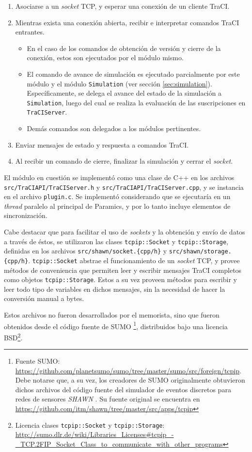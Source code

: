 \begin{enumerate}
    \item Asociarse a un \emph{socket} TCP, y esperar una conexión de un cliente TraCI.
    \item Mientras exista una conexión abierta, recibir e interpretar comandos TraCI entrantes.
    \begin{itemize}
        \item En el caso de los comandos de obtención de versión y cierre de la conexión, estos son ejecutados por el módulo mismo.
        \item El comando de avance de simulación es ejecutado parcialmente por este módulo y el módulo \texttt{Simulation} (ver sección \ref{sec:simulation}). Específicamente, se delega el avance del estado de la simulación a \texttt{Simulation}, luego del cual se realiza la evaluación de las suscripciones en \texttt{TraCIServer}.
        \item Demás comandos son delegados a los módulos pertinentes.
    \end{itemize}
    \item Enviar mensajes de estado y respuesta a comandos TraCI.
    \item Al recibir un comando de cierre, finalizar la simulación y cerrar el \emph{socket}.
\end{enumerate}

El módulo en cuestión se implementó como una clase de C++ en los archivos \texttt{src/TraCIAPI/TraCIServer.h} y \texttt{src/TraCIAPI/TraCIServer.cpp}, y se instancia en el archivo \texttt{plugin.c}. Se implementó considerando que se ejecutaría en un \emph{thread} paralelo al principal de Paramics, y por lo tanto incluye elementos de sincronización.

Cabe destacar que para facilitar el uso de \emph{sockets} y la obtención y envío de datos a través de éstos, se utilizaron las clases \texttt{tcpip::Socket} y \texttt{tcpip::Storage}, definidas en los archivos \texttt{src/shawn/socket.\{cpp/h\}} y \texttt{src/shawn/storage.\{cpp/h\}}. \texttt{tcpip::Socket} abstrae el funcionamiento de un \textit{socket} TCP, y provee métodos de conveniencia que permiten leer y escribir mensajes TraCI completos como objetos \texttt{tcpip::Storage}. Estos a su vez proveen métodos para escribir y leer todo tipo de variables en dichos mensajes, sin la necesidad de hacer la conversión manual a bytes.

Estos archivos no fueron desarrollados por el memorista, sino que fueron obtenidos desde el código fuente de SUMO \footnote{Fuente SUMO: \url{https://github.com/planetsumo/sumo/tree/master/sumo/src/foreign/tcpip}. Debe notarse que, a su vez, los creadores de SUMO originalmente obtuvieron dichos archivos del código fuente del simulador de eventos discretos para redes de sensores \emph{SHAWN} \cite{kroller2005shawn}. Su fuente original se encuentra en \url{https://github.com/itm/shawn/tree/master/src/apps/tcpip}}, distribuidos bajo una licencia BSD\footnote{Licencia clases \texttt{tcpip::Socket} y \texttt{tcpip::Storage}: \url{http://sumo.dlr.de/wiki/Libraries_Licenses\#tcpip_-_TCP.2FIP_Socket_Class_to_communicate_with_other_programs}}.

